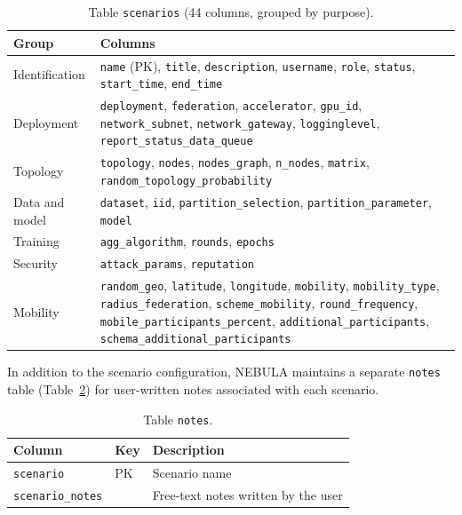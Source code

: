 \documentclass[9pt,a4paper,twocolumn]{article}
\begin{document}
\begin{table}[H]
\centering
\scriptsize
\begin{tabularx}{\columnwidth}{l X}
\hline
\textbf{Group} & \textbf{Columns} \\
\hline
Identification & \texttt{name} (PK), \texttt{title}, \texttt{description}, \texttt{username}, \texttt{role}, \texttt{status}, \texttt{start\_time}, \texttt{end\_time} \\
Deployment & \texttt{deployment}, \texttt{federation}, \texttt{accelerator}, \texttt{gpu\_id}, \texttt{network\_subnet}, \texttt{network\_gateway}, \texttt{logginglevel}, \texttt{report\_status\_data\_queue} \\
Topology & \texttt{topology}, \texttt{nodes}, \texttt{nodes\_graph}, \texttt{n\_nodes}, \texttt{matrix}, \texttt{random\_topology\_probability} \\
Data and model & \texttt{dataset}, \texttt{iid}, \texttt{partition\_selection}, \texttt{partition\_parameter}, \texttt{model} \\
Training & \texttt{agg\_algorithm}, \texttt{rounds}, \texttt{epochs} \\
Security & \texttt{attack\_params}, \texttt{reputation} \\
Mobility & \texttt{random\_geo}, \texttt{latitude}, \texttt{longitude}, \texttt{mobility}, \texttt{mobility\_type}, \texttt{radius\_federation}, \texttt{scheme\_mobility}, \texttt{round\_frequency}, \texttt{mobile\_participants\_percent}, \texttt{additional\_participants}, \texttt{schema\_additional\_participants} \\
\hline
\end{tabularx}
\caption{Table \texttt{scenarios} (44 columns, grouped by purpose).}
\label{tab:db-scenarios}
\end{table}

In addition to the scenario configuration, NEBULA maintains a separate \texttt{notes} table (Table~\ref{tab:db-notes}) for user-written notes associated with each scenario.

\begin{table}[H]
\centering
\scriptsize
\begin{tabularx}{\columnwidth}{l l X}
\hline
\textbf{Column} & \textbf{Key} & \textbf{Description} \\
\hline
\texttt{scenario}       & PK & Scenario name \\
\texttt{scenario\_notes} &   & Free-text notes written by the user \\
\hline
\end{tabularx}
\caption{Table \texttt{notes}.}
\label{tab:db-notes}
\end{table}
\end{document}
